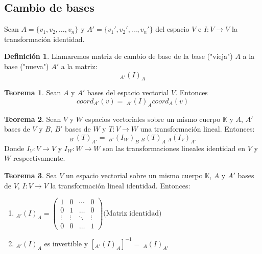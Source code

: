 \documentclass[10pt]{article}
\theoremstyle{definition}
\newtheorem{definition}{Definición}[section]
\newtheorem{theorem}{Teorema}[section]
\begin{document}
\subsection{Cambio de bases}
Sean $A=\{v_1,v_2,\dots,v_n\}$ y $A'=\{v_1',v_2',\dots,v_n'\}$ del espacio $V$ e $I:V\to V$ la transformación identidad.
\begin{definition}
	Llamaremos matriz de cambio de base de la base ("vieja") $A$ a la base ("nueva") $A'$ a la matriz:$$_{A'}(I)_A$$
\end{definition}
\begin{theorem}
	Sean $A$ y $A'$ bases del espacio vectorial $V$. Entonces $$coord_{A'}(v)=\ _{A'}(I)_A coord_A(v)$$
\end{theorem}
\begin{theorem}
	Sean $V$ y $W$ espacios vectoriales sobre un mismo cuerpo $\mathbb{K}$ y $A$, $A'$ bases de $V$ y $B$, $B'$ bases de $W$ y $T:V\to W$ una transformación lineal. Entonces:
	$$_{B'}(T)_{A'}=\ _{B'}(I_W)_B \ _B(T)_A \ _A(I_V)_{A'}$$
	Donde $I_V:V\to V$ y $I_W:W\to W$ son las transformaciones lineales identidad en $V$ y $W$ respectivamente.
\end{theorem}
\begin{theorem}
	Sea $V$ un espacio vectorial sobre un mismo cuerpo $\mathbb{K}$, $A$ y $A'$ bases de $V$, $I:V\to V$ la transformación lineal identidad. Entonces:
	\begin{enumerate}
		\item $_{A'}(I)_A=\begin{pmatrix}1&0&\cdots&0\\0&1&\dots&0\\\vdots&\vdots&\ddots&\vdots\\0&0&\dots&1\end{pmatrix}\text{(Matriz identidad)}$
		\item $_{A'}(I)_A$ es invertible y $[_{A'}(I)_A]^{-1}=\ _A(I)_{A'}$
	\end{enumerate}
\end{theorem}
\end{document}
